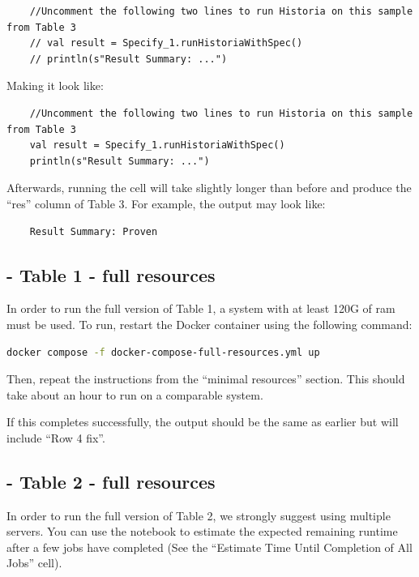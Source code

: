 \documentclass{acmart} %
\begin{document}
\begin{lstlisting}
    //Uncomment the following two lines to run Historia on this sample from Table 3
    // val result = Specify_1.runHistoriaWithSpec()
    // println(s"Result Summary: ...")
\end{lstlisting}

Making it look like: 

\begin{lstlisting}
    //Uncomment the following two lines to run Historia on this sample from Table 3
    val result = Specify_1.runHistoriaWithSpec()
    println(s"Result Summary: ...")
\end{lstlisting}


Afterwards, running the cell will take slightly longer than before  and produce the ``res'' column of Table 3.  For example, the output may look like:

\begin{lstlisting} 
    Result Summary: Proven
\end{lstlisting}


\subsection{ - Table 1 - full resources}

In order to run the full version of Table 1, a system with at least 120G of ram must be used. To run, restart the Docker container using the following command:

\begin{lstlisting}[language=bash]
  docker compose -f docker-compose-full-resources.yml up
\end{lstlisting}

Then, repeat the instructions from the ``minimal resources'' section.  This should take about an hour to run on a comparable system.

If this completes successfully, the output should be the same as earlier but will include ``Row 4 fix''.  

\subsection{ - Table 2 - full resources}

In order to run the full version of Table 2, we strongly suggest using multiple servers.
You can use the  notebook to estimate the expected remaining runtime after a few jobs have completed (See the ``Estimate Time Until Completion of All Jobs'' cell).
\end{document}
